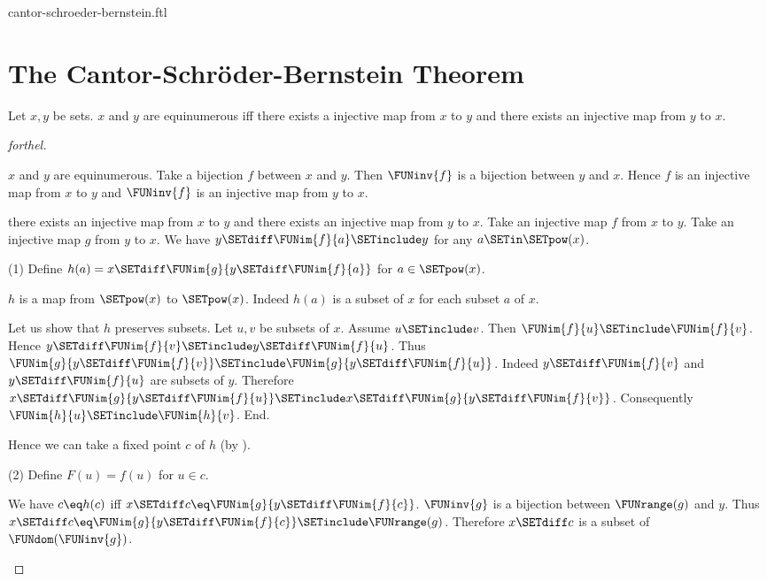 \documentclass{stex}
\begin{document}
\begin{smodule}{cantor-schroeder-bernstein.ftl}
\section*{The Cantor-Schröder-Bernstein Theorem}

\begin{theorem}[forthel,title=Cantor-Schröder-Bernstein,id=cantor_schroeder_bernstein]
  Let $x,y$ be sets.
  $x$ and $y$ are equinumerous iff there exists a injective map from $x$ to $y$ and there exists an injective map from $y$ to $x$.
\end{theorem}
\begin{proof}[forthel]
  \begin{case}{$x$ and $y$ are equinumerous.}
    Take a bijection $f$ between $x$ and $y$.
    Then $\FUNinv{f}$ is a bijection between $y$ and $x$.
    Hence $f$ is an injective map from $x$ to $y$ and $\FUNinv{f}$ is an
    injective map from $y$ to $x$.
  \end{case}

  \begin{case}{there exists an injective map from $x$ to $y$ and there exists an injective map from $y$ to $x$.}
    Take an injective map $f$ from $x$ to $y$.
    Take an injective map $g$ from $y$ to $x$.
    We have $y \SETdiff \FUNim{f}{a} \SETinclude y$ for any $a \SETin \SETpow(x)$.

    (1) Define $h(a) = x \SETdiff \FUNim{g}{y \SETdiff \FUNim{f}{a}}$ for $a \in \SETpow(x)$.

    $h$ is a map from $\SETpow(x)$ to $\SETpow(x)$.
    Indeed $h(a)$ is a subset of $x$ for each subset $a$ of $x$.

    Let us show that $h$ preserves subsets.
      Let $u, v$ be subsets of $x$.
      Assume $u \SETinclude v$.
      Then $\FUNim{f}{u} \SETinclude \FUNim{f}{v}$.
      Hence $y \SETdiff \FUNim{f}{v} \SETinclude y \SETdiff \FUNim{f}{u}$.
      Thus $\FUNim{g}{y \SETdiff \FUNim{f}{v}} \SETinclude \FUNim{g}{y \SETdiff \FUNim{f}{u}}$.
      Indeed $y \SETdiff \FUNim{f}{v}$ and $y \SETdiff \FUNim{f}{u}$ are subsets of $y$.
      Therefore $x \SETdiff \FUNim{g}{y \SETdiff \FUNim{f}{u}} \SETinclude x \SETdiff \FUNim{g}{y \SETdiff \FUNim{f}{v}}$.
      Consequently $\FUNim{h}{u} \SETinclude \FUNim{h}{v}$.
    End.

    Hence we can take a fixed point $c$ of $h$ (by ).

    (2) Define $F(u) = f(u)$ for $u \in c$.

    We have $c \eq h(c)$ iff $x \SETdiff c \eq \FUNim{g}{y \SETdiff \FUNim{f}{c}}$.
    $\FUNinv{g}$ is a bijection between $\FUNrange(g)$ and $y$.
    Thus $x \SETdiff c \eq \FUNim{g}{y \SETdiff \FUNim{f}{c}} \SETinclude \FUNrange(g)$.
    Therefore $x \SETdiff c$ is a subset of $\FUNdom(\FUNinv{g})$.


\end{case}
\end{proof}
\end{smodule}
\end{document}
